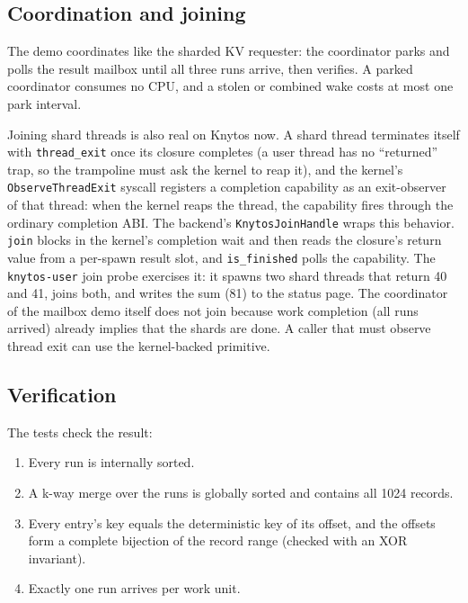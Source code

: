 \subsection{Coordination and joining}

The demo coordinates like the sharded KV requester: the coordinator parks and
polls the result mailbox until all three runs arrive, then verifies. A parked
coordinator consumes no CPU, and a stolen or combined wake costs at most one
park interval.

Joining shard threads is also real on Knytos now. A shard thread
terminates itself with \texttt{thread\_exit} once its closure completes (a
user thread has no ``returned'' trap, so the trampoline must ask the kernel
to reap it), and the kernel's \texttt{ObserveThreadExit} syscall registers a
completion capability as an exit-observer of that thread: when the kernel
reaps the thread, the capability fires through the ordinary completion ABI.
The backend's \texttt{KnytosJoinHandle} wraps this behavior. \texttt{join}
blocks in the kernel's completion wait and then reads the closure's return
value from a per-spawn result slot, and \texttt{is\_finished} polls the
capability. The \texttt{knytos-user} join probe exercises it: it spawns two
shard threads that return 40 and 41, joins both, and writes the sum (81) to
the status page. The coordinator of the mailbox demo itself does not join because
work completion (all runs arrived) already implies that the shards are done. A
caller that must observe thread exit can use the kernel-backed primitive.

\subsection{Verification}

The tests check the result:

\begin{enumerate}
    \item Every run is internally sorted.
    \item A k-way merge over the runs is globally sorted and contains all
        1024 records.
    \item Every entry's key equals the deterministic key of its offset,
        and the offsets form a complete bijection of the record range
        (checked with an XOR invariant).
    \item Exactly one run arrives per work unit.
\end{enumerate}

